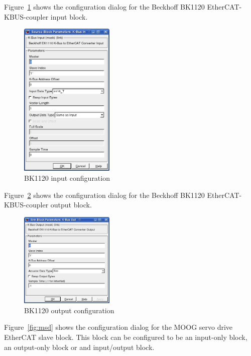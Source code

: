 Figure~\ref{fig:bk1120-in} shows the configuration dialog for the Beckhoff
BK1120 EtherCAT-KBUS-coupler input block.

\begin{figure}[H]
  \begin{center}
    \includegraphics[width=0.4\textwidth]{images/bk1120-in.png}
    \caption{BK1120 input configuration}
    \label{fig:bk1120-in}
  \end{center}
\end{figure}

Figure~\ref{fig:bk1120-out} shows the configuration dialog for the Beckhoff
BK1120 EtherCAT-KBUS-coupler output block.

\begin{figure}[H]
  \begin{center}
    \includegraphics[width=0.4\textwidth]{images/bk1120-out.png}
    \caption{BK1120 output configuration}
    \label{fig:bk1120-out}
  \end{center}
\end{figure}

Figure~\ref{fig:msd} shows the configuration dialog for the MOOG servo drive
EtherCAT slave block. This block can be configured to be an input-only block,
an output-only block or and input/output block.

